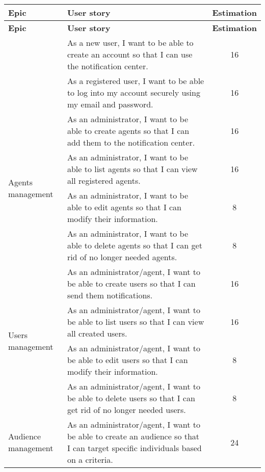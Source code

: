 \begin{longtable}{ | m{}  | m{} | c | }
        \hline
        \textbf{Epic} & \textbf{User story} & \textbf{Estimation} \\
        \hline
        \endfirsthead
        \hline
        \textbf{Epic} & \textbf{User story} & \textbf{Estimation} \\
        \hline  
        \endhead
        \hline
        \endfoot
        \endlastfoot
        \multirow{2}{5em}{Authentication} & As a new user, I want to be able to create an account so that I can use the notification center. & 16 \\
        \cline{2-3}
        & As a registered user, I want to be able to log into my account securely using my email and password. & 16 \\
        \hline
        \multirow{4}{5em}{Agents management} & As an administrator, I want to be able to create agents so that I can add them to the notification center. & 16 \\
        \cline{2-3}
        & As an administrator, I want to be able to list agents so that I can view all registered agents. & 16 \\
        \cline{2-3}
        & As an administrator, I want to be able to edit agents so that I can modify their information. & 8 \\
        \cline{2-3}
        & As an administrator, I want to be able to delete agents so that I can get rid of no longer needed agents. & 8 \\
        \hline
        \multirow{4}{5em}{Users management} & As an administrator/agent, I want to be able to create users so that I can send them notifications. & 16 \\
        \cline{2-3}
        & As an administrator/agent, I want to be able to list users so that I can view all created users. & 16 \\
        \cline{2-3}
        & As an administrator/agent, I want to be able to edit users so that I can modify their information. & 8 \\
        \cline{2-3}
        &  As an administrator/agent, I want to be able to delete users so that I can get rid of no longer needed users. & 8 \\
        \hline
        \multirow{4}{5em}{Audience management} & As an administrator/agent, I want to be able to create an audience so that I can target specific individuals based on a criteria. & 24 \\
        \cline{2-3}

\end{longtable}
